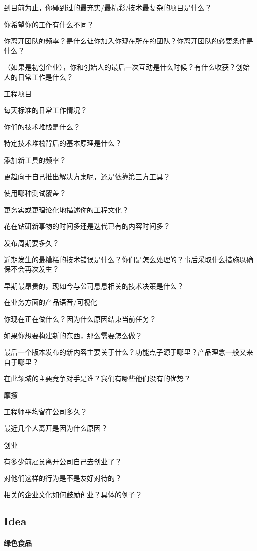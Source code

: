 \documentclass{book}
\begin{document}
到目前为止，你碰到过的最充实/最精彩/技术最复杂的项目是什么？

你希望你的工作有什么不同？

你离开团队的频率？是什么让你加入你现在所在的团队？你离开团队的必要条件是什么？

（如果是初创企业），你和创始人的最后一次互动是什么时候？有什么收获？创始人的日常工作是什么？

工程项目

每天标准的日常工作情况？

你们的技术堆栈是什么？

特定技术堆栈背后的基本原理是什么？

添加新工具的频率？

更趋向于自己推出解决方案呢，还是依靠第三方工具？

使用哪种测试覆盖？

更务实或更理论化地描述你的工程文化？

花在钻研新事物的时间多还是迭代已有的内容时间多？

发布周期要多久？

近期发生的最糟糕的技术错误是什么？你们是怎么处理的？事后采取什么措施以确保不会再次发生？

早期最昂贵的，现如今与公司息息相关的技术决策是什么？

在业务方面的产品语音/可视化

你现在正在做什么？因为什么原因结束当前任务？

如果你想要构建新的东西，那么需要怎么做？

最后一个版本发布的新内容主要关于什么？功能点子源于哪里？产品理念一般又来自于哪里？

在此领域的主要竞争对手是谁？我们有哪些他们没有的优势？

摩擦

工程师平均留在公司多久？

最近几个人离开是因为什么原因？

创业

有多少前雇员离开公司自己去创业了？

对他们这样的行为是不是友好对待的？

相关的企业文化如何鼓励创业？具体的例子？

\subsection{Idea}

\paragraph{绿色食品}
\end{document}
